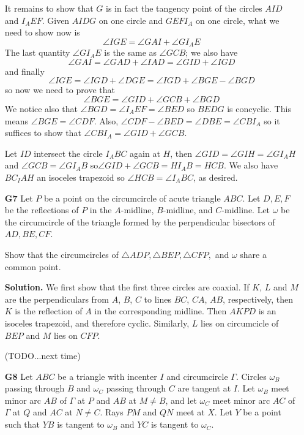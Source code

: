 \documentclass[11pt,a4paper]{article}
\begin{document}
\begin{enumerate}
	It remains to show that $G$ is in fact the tangency point of the circles $AID$ and $I_AEF$. Given $AIDG$ on one circle and $GEFI_A$ on one circle, what we need to show now is 
	\[
	\angle IGE = \angle GAI + \angle GI_AE
	\]
	The last quantity $\angle GI_AE$ is the same as $\angle GCB$; we also have 
	\[
	\angle GAI = \angle GAD+\angle IAD = \angle GID+\angle IGD 
	\]
	and finally 
	\[
	\angle IGE=\angle IGD+\angle DGE = \angle IGD+\angle BGE-\angle BGD 
	\]
	so now we need to prove that 
	\[
	\angle BGE=\angle GID + \angle GCB + \angle BGD
	\]
	We notice also that $\angle BGD=\angle I_AEF = \angle BED$ so $BEDG$ is concyclic. This means $\angle BGE=\angle CDF$. 
	Also, $\angle CDF-\angle BED=\angle DBE=\angle CBI_A$ so it suffices to show that $\angle CBI_A=\angle GID+\angle GCB$. 
	
	Let $ID$ intersect the circle $I_ABC$ again at $H$, then $\angle GID=\angle GIH=\angle GI_AH$ and $\angle GCB=\angle GI_AB$ so$\angle GID+\angle GCB=HI_AB=HCB$. We also have $BC_IAH$ an isoceles trapezoid so $\angle HCB=\angle I_ABC$, as desired. 
	
	\item [\textbf{G7}] Let $P$ be a point on the circumcircle of acute triangle $ABC$. Let $D,E,F$ be the reflections of $P$ in the $A$-midline, $B$-midline, and $C$-midline. Let $\omega$ be the circumcircle of the triangle formed by the perpendicular bisectors of $AD, BE, CF$.
	
	Show that the circumcircles of $\triangle ADP, \triangle BEP, \triangle CFP,$ and $\omega$ share a common point.
	
	\textbf{Solution.} We first show that the first three circles are coaxial. If $K$, $L$ and $M$ are the perpendiculars from $A$, $B$, $C$ to lines $BC$, $CA$, $AB$, respectively, then $K$ is the reflection of $A$ in the corresponding midline. Then $AKPD$ is an isoceles trapezoid, and therefore cyclic. 
	Similarly, $L$ lies on circumcicle of $BEP$ and $M$ lies on $CFP$. 
	
	(TODO...next time)
	
	\item [\textbf{G8}]
	Let $ABC$ be a triangle with incenter $I$ and circumcircle $\Gamma$. Circles $\omega_{B}$ passing through $B$ and $\omega_{C}$ passing through $C$ are tangent at $I$. Let $\omega_{B}$ meet minor arc $AB$ of $\Gamma$ at $P$ and $AB$ at $M\neq B$, and let $\omega_{C}$ meet minor arc $AC$ of $\Gamma$ at $Q$ and $AC$ at $N\neq C$. Rays $PM$ and $QN$ meet at $X$. Let $Y$ be a point such that $YB$ is tangent to $\omega_{B}$ and $YC$ is tangent to $\omega_{C}$.
	

\end{enumerate}
\end{document}
